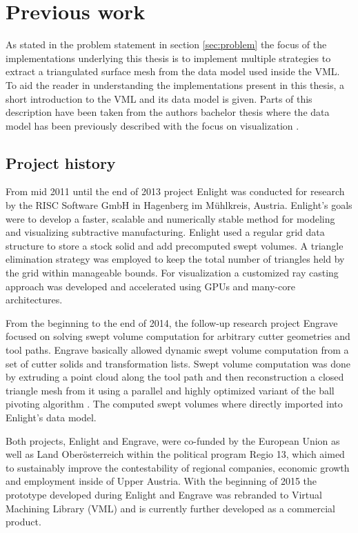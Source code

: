 \chapter{Previous work}
\label{ch:previous_work}

As stated in the problem statement in section \ref{sec:problem} the focus of the implementations underlying this thesis is to implement multiple strategies to extract a triangulated surface mesh from the data model used inside the VML.
To aid the reader in understanding the implementations present in this thesis, a short introduction to the VML and its data model is given.
Parts of this description have been taken from the authors bachelor thesis where the data model has been previously described with the focus on visualization \cite{bachelor}.

\section{Project history}
\label{sec:project_history}

From mid 2011 until the end of 2013 project Enlight was conducted for research by the RISC Software GmbH in Hagenberg im M\"uhlkreis, Austria.
Enlight's goals were to develop a faster, scalable and numerically stable method for modeling and visualizing subtractive manufacturing.
Enlight used a regular grid data structure to store a stock solid and add precomputed swept volumes.
A triangle elimination strategy was employed to keep the total number of triangles held by the grid within manageable bounds.
For visualization a customized ray casting approach was developed \cite{enlight} and accelerated using GPUs and many-core architectures.

From the beginning to the end of 2014, the follow-up research project Engrave focused on solving swept volume computation for arbitrary cutter geometries and tool paths.
Engrave basically allowed dynamic swept volume computation from a set of cutter solids and transformation lists.
Swept volume computation was done by extruding a point cloud along the tool path and then reconstruction a closed triangle mesh from it using a parallel and highly optimized variant of the ball pivoting algorithm 
\cite{engrave}.
The computed swept volumes where directly imported into Enlight's data model.

Both projects, Enlight and Engrave, were co-funded by the European Union as well as Land Oberösterreich within the political program Regio 13, which aimed to sustainably improve the contestability of regional companies, economic growth and employment inside of Upper Austria.
%
With the beginning of 2015 the prototype developed during Enlight and Engrave was rebranded to Virtual Machining Library (VML) and is currently further developed as a commercial product.

